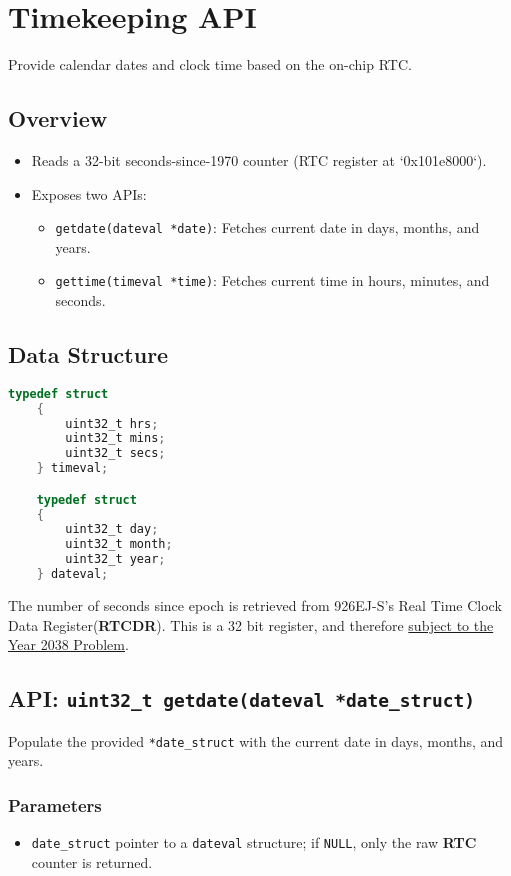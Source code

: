\newpage
\section{Timekeeping API}
Provide calendar dates and clock time based on the on-chip RTC.

\subsection*{Overview}
\begin{itemize}
    \item Reads a 32-bit seconds-since-1970 counter (RTC register at `0x101e8000`).
    \item Exposes two APIs:
    \begin{itemize}
        \item \texttt{getdate(dateval *date)}: Fetches current date in days, months, and years.
        \item \texttt{gettime(timeval *time)}: Fetches current time in hours, minutes, and seconds.
    \end{itemize}
\end{itemize}

\subsection*{Data Structure}

\begin{lstlisting}[language=C, caption={Structure definitions for time and date values.}, label={lst:datetime_structs}]
    typedef struct
    {
        uint32_t hrs;
        uint32_t mins;
        uint32_t secs;
    } timeval;

    typedef struct
    {
        uint32_t day;
        uint32_t month;
        uint32_t year;
    } dateval;
\end{lstlisting}

\noindent
The number of seconds since epoch is retrieved from 926EJ-S's Real Time Clock 
Data Register(\textbf{RTCDR}). This is a 32 bit register, and therefore 
\underline{subject to the Year 2038 Problem}.

\subsection{API: \texttt{uint32\_t getdate(dateval *date\_struct)}}
Populate the provided \texttt{*date\_struct} with the current date in days, months, and years.

\subsubsection*{Parameters}
\begin{itemize}
    \item \texttt{date\_struct} pointer to a \texttt{dateval} structure; if \texttt{NULL}, 
    only the raw \textbf{RTC} counter is returned.
\end{itemize}

